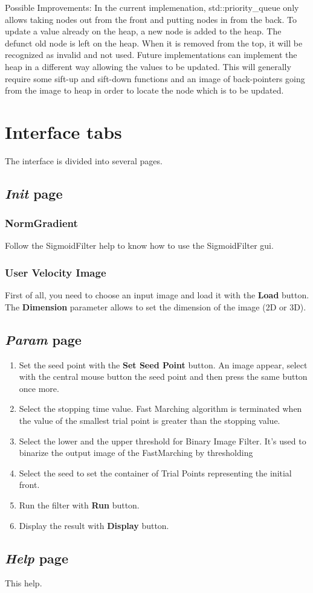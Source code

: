 \documentclass{article}
\begin{document}
Possible Improvements: In the current implemenation, std::priority\_queue only allows taking nodes out from the front and putting nodes in from the back. To update a value already on the heap, a new node is added to the heap. The defunct old node is left on the heap. When it is removed from the top, it will be recognized as invalid and not used. Future implementations can implement the heap in a different way allowing the values to be updated. This will generally require some sift-up and sift-down functions and an image of back-pointers going from the image to heap in order to locate the node which is to be updated.

\section{Interface tabs}

The interface is divided into several pages.

\subsection{\emph{Init} page}

\subsubsection{NormGradient}

Follow the SigmoidFilter help to know how to use the SigmoidFilter gui.

\subsubsection{User Velocity Image}

First of all, you need to choose an input image and load it with the {\bf Load} button.
The {\bf Dimension} parameter allows to set the dimension of the image (2D or 3D).

\subsection{\emph{Param} page}

\begin{enumerate}
  \item Set the seed point with the {\bf Set Seed Point} button. An image appear, select with the central mouse button the seed point and then press the same button once more.
  \item Select the stopping time value. Fast Marching algorithm is terminated when the value of the smallest trial point is greater than the stopping value.
  \item Select the lower and the upper threshold for Binary Image Filter. It's used to binarize the output image of the FastMarching by thresholding
  \item Select the seed to set the container of Trial Points representing the initial front.
  \item Run the filter with {\bf Run} button.
  \item Display the result with {\bf Display} button.
\end{enumerate}


\subsection{\emph{Help} page}
This help.
\end{document}
